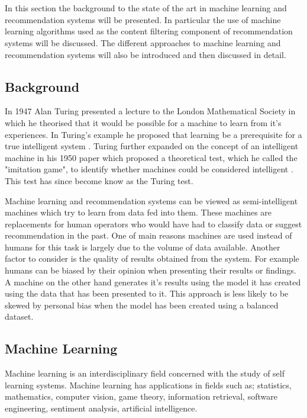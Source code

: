 \chapter{}

In this section the background to the state of the art in machine learning and recommendation systems will be presented.
In particular the use of machine learning algorithms used as the content filtering component of recommendation systems will be discussed.
The different approaches to machine learning and recommendation systems will also be introduced and then discussed in detail.

\section{Background}
In 1947 Alan Turing presented a lecture to the London Mathematical Society in which he theorised that it would be possible for a machine to learn from it's experiences.
In Turing's example he proposed that learning be a prerequisite for a true intelligent system \cite{Turing1946}.
Turing further expanded on the concept of an intelligent machine in his 1950 paper which proposed a theoretical test, which he called the "imitation game", to identify whether machines could be considered intelligent \cite{Turing1950}.
This test has since become know as the Turing test.

Machine learning and recommendation systems can be viewed as semi-intelligent machines which try to learn from data fed into them.
These machines are replacements for human operators who would have had to classify data or suggest recommendation in the past.
One of main reasons machines are used instead of humans for this task is largely due to the volume of data available.
Another factor to consider is the quality of results obtained from the system.
For example humans can be biased by their opinion when presenting their results or findings.
A machine on the other hand generates it's results using the model it has created using the data that has been presented to it.
This approach is less likely to be skewed by personal bias when the model has been created using a balanced dataset\cite{FProvost2000}.

\section{Machine Learning}
Machine learning is an interdisciplinary field concerned with the study of self learning systems.
Machine learning has applications in fields such as; statistics, mathematics, computer vision, game theory, information retrieval, software engineering, sentiment analysis, artificial intelligence.

